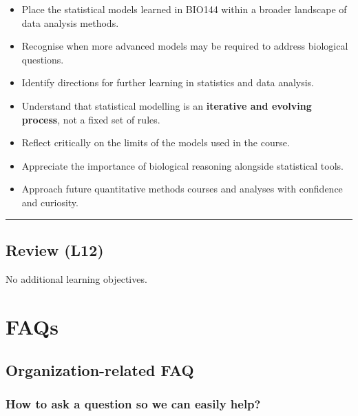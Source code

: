 \documentclass[
  letterpaper,
  8pt,
  a4paper]{book}
\providecommand{\tightlist}{%
  \setlength{\itemsep}{0pt}\setlength{\parskip}{0pt}}
\begin{document}
\begin{itemize}
\tightlist
\item
  Place the statistical models learned in BIO144 within a broader
  landscape of data analysis methods.
\item
  Recognise when more advanced models may be required to address
  biological questions.
\item
  Identify directions for further learning in statistics and data
  analysis.
\item
  Understand that statistical modelling is an \textbf{iterative and
  evolving process}, not a fixed set of rules.
\item
  Reflect critically on the limits of the models used in the course.
\item
  Appreciate the importance of biological reasoning alongside
  statistical tools.
\item
  Approach future quantitative methods courses and analyses with
  confidence and curiosity.
\end{itemize}

\begin{center}\rule{0.5\linewidth}{0.5pt}\end{center}

\section*{Review (L12)}\label{review-l12}


No additional learning objectives.


\chapter*{FAQs}\label{faqs}


\section*{Organization-related FAQ}\label{organization-related-faq}


\subsection*{How to ask a question so we can easily
help?}\label{how-to-ask-a-question-so-we-can-easily-help}
\end{document}
